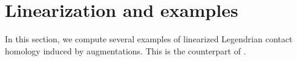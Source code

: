 \documentclass[11pt]{amsart}
\makeatletter
\renewenvironment{proof}[1][\proofname] {\par\pushQED{\qed}{\normalfont\bfseries\topsep6\p@\@plus6\p@\relax #1\@addpunct{.} }}{\popQED\endtrivlist\@endpefalse}
\theoremstyle{mystyle}
\newtheorem{remark}[remark]{Remark}
\newcommand{\R}{\mathbb{R}}
\newcommand{\<}{\langle}
\renewcommand{\>}{\rangle}
\makeatother
\begin{document}


\section{Linearization and examples}\label{sec:linearization}

In this section, we compute several examples of linearized Legendrian contact homology induced by augmentations. This is the counterpart of \cite[Sec. 4,5]{chekanov2002dga}.
\end{document}
